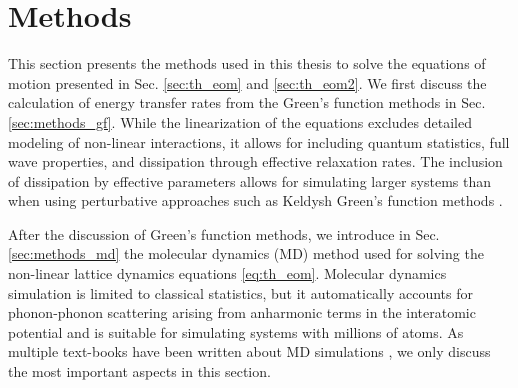 


\section{Methods}
\label{sec:methods}
This section presents the methods used in this thesis to solve the equations of motion presented in Sec. \ref{sec:th_eom} and \ref{sec:th_eom2}. We first discuss the calculation of energy transfer rates from the Green's function methods in Sec. \ref{sec:methods_gf}. While the linearization of the equations excludes detailed modeling of non-linear interactions, it allows for including quantum statistics, full wave properties, and dissipation through effective relaxation rates. The inclusion of dissipation by effective parameters allows for simulating larger systems than when using perturbative approaches such as Keldysh Green's function methods \cite{haugjauho}.  %

After the discussion of Green's function methods, we introduce in Sec. \ref{sec:methods_md} the molecular dynamics (MD) method used for solving the non-linear lattice dynamics equations \eqref{eq:th_eom}. Molecular dynamics simulation is limited to classical statistics, but it automatically accounts for phonon-phonon scattering arising from anharmonic terms in the interatomic potential and is suitable for simulating systems with millions of atoms. As multiple text-books have been written about MD simulations \cite{allentildesley,frenkelsmit}, we only discuss the most important aspects in this section.

